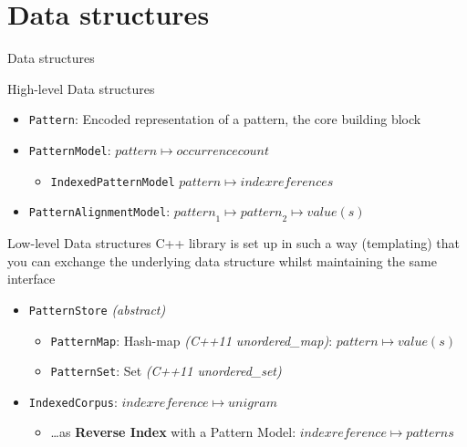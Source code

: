 \documentclass[compress]{beamer}
\begin{document}
\section{Data structures}

\begin{frame}{Data structures}

  \begin{block}{High-level Data structures}
    \begin{itemize}
      \item \texttt{Pattern}: Encoded representation of a pattern, the core
        building block
      \item \texttt{PatternModel}: ${pattern} \mapsto {occurrencecount}$
      \begin{itemize}
        \item \texttt{IndexedPatternModel} ${pattern} \mapsto {indexreferences}$
      \end{itemize}
      \item \texttt{PatternAlignmentModel}:  ${pattern}_1 \mapsto {pattern}_2 \mapsto {value(s)}$
    \end{itemize}
  \end{block}

\end{frame}


\begin{frame}

  \begin{block}{Low-level Data structures}
     C++ library is set up in such a way (templating) that you can exchange the
      underlying data structure whilst maintaining the same interface

    \begin{itemize}
      \item \texttt{PatternStore} \emph{(abstract)}
      \begin{itemize}
        \item \texttt{PatternMap}: Hash-map \emph{(C++11 unordered\_map)}:
          ${pattern} \mapsto {value(s)}$
        \item \texttt{PatternSet}: Set \emph{(C++11 unordered\_set)}
      \end{itemize}
      \item \texttt{IndexedCorpus}: ${indexreference} \mapsto {unigram}$
      \begin{itemize}
        \item \ldots as \textbf{Reverse Index} with a Pattern Model: ${indexreference} \mapsto {patterns}$
      \end{itemize}
    \end{itemize}
  \end{block}


\end{frame}
\end{document}
